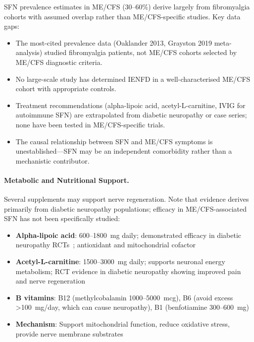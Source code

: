 \begin{limitation}
SFN prevalence estimates in ME/CFS (30--60\%) derive largely from fibromyalgia cohorts with assumed overlap rather than ME/CFS-specific studies. Key data gaps:
\begin{itemize}
    \item The most-cited prevalence data (Oaklander 2013, Grayston 2019 meta-analysis) studied fibromyalgia patients, not ME/CFS cohorts selected by ME/CFS diagnostic criteria.
    \item No large-scale study has determined IENFD in a well-characterised ME/CFS cohort with appropriate controls.
    \item Treatment recommendations (alpha-lipoic acid, acetyl-L-carnitine, IVIG for autoimmune SFN) are extrapolated from diabetic neuropathy or case series; none have been tested in ME/CFS-specific trials.
    \item The causal relationship between SFN and ME/CFS symptoms is unestablished---SFN may be an independent comorbidity rather than a mechanistic contributor.
\end{itemize}
\end{limitation}

\paragraph{Metabolic and Nutritional Support.}
Several supplements may support nerve regeneration. Note that evidence derives primarily from diabetic neuropathy populations; efficacy in ME/CFS-associated SFN has not been specifically studied:

\begin{itemize}
    \item \textbf{Alpha-lipoic acid}: 600--1800~mg daily; demonstrated efficacy in diabetic neuropathy RCTs~\cite{Ziegler2006ALA}; antioxidant and mitochondrial cofactor
    \item \textbf{Acetyl-L-carnitine}: 1500--3000~mg daily; supports neuronal energy metabolism; RCT evidence in diabetic neuropathy showing improved pain and nerve regeneration~\cite{Sima2005ALCAR}
    \item \textbf{B vitamins}: B12 (methylcobalamin 1000--5000~mcg), B6 (avoid excess >100~mg/day, which can cause neuropathy), B1 (benfotiamine 300--600~mg)
    \item \textbf{Mechanism}: Support mitochondrial function, reduce oxidative stress, provide nerve membrane substrates
\end{itemize}

